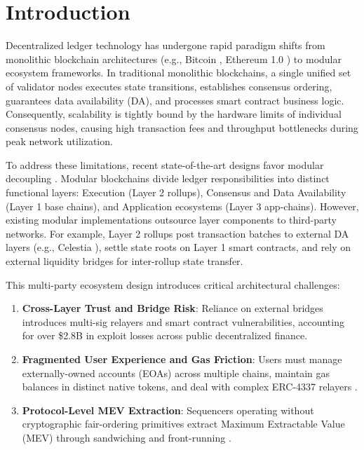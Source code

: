 \documentclass[10pt,journal,compsoc,twocolumn]{IEEEtran}
\begin{document}
\section{Introduction}
\label{sec:intro}

Decentralized ledger technology has undergone rapid paradigm shifts from monolithic blockchain architectures (e.g., Bitcoin \cite{lamport1982byzantine}, Ethereum 1.0 \cite{wood2014ethereum}) to modular ecosystem frameworks. In traditional monolithic blockchains, a single unified set of validator nodes executes state transitions, establishes consensus ordering, guarantees data availability (DA), and processes smart contract business logic. Consequently, scalability is tightly bound by the hardware limits of individual consensus nodes, causing high transaction fees and throughput bottlenecks during peak network utilization.

To address these limitations, recent state-of-the-art designs favor modular decoupling \cite{al2019celestia, kalodner2018arbitrum, kwon2019cosmos}. Modular blockchains divide ledger responsibilities into distinct functional layers: Execution (Layer 2 rollups), Consensus and Data Availability (Layer 1 base chains), and Application ecosystems (Layer 3 app-chains). However, existing modular implementations outsource layer components to third-party networks. For example, Layer 2 rollups post transaction batches to external DA layers (e.g., Celestia \cite{al2019celestia}), settle state roots on Layer 1 smart contracts, and rely on external liquidity bridges for inter-rollup state transfer.

This multi-party ecosystem design introduces critical architectural challenges:
\begin{enumerate}
    \item \textbf{Cross-Layer Trust and Bridge Risk}: Reliance on external bridges introduces multi-sig relayers and smart contract vulnerabilities, accounting for over \$2.8B in exploit losses across public decentralized finance.
    \item \textbf{Fragmented User Experience and Gas Friction}: Users must manage externally-owned accounts (EOAs) across multiple chains, maintain gas balances in distinct native tokens, and deal with complex ERC-4337 relayers \cite{erc4337}.
    \item \textbf{Protocol-Level MEV Extraction}: Sequencers operating without cryptographic fair-ordering primitives extract Maximum Extractable Value (MEV) through sandwiching and front-running \cite{daian2020flashboys}.
\end{enumerate}
\end{document}
